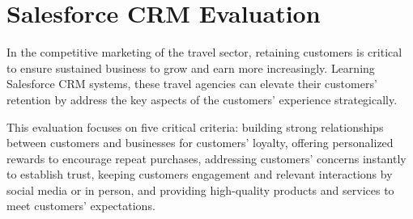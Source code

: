\section{Salesforce CRM Evaluation}

In the competitive marketing of the travel sector, retaining customers is critical to ensure sustained business to grow and earn more increasingly. Learning Salesforce CRM systems, these travel agencies can elevate their customers' retention by address the key aspects of the customers' experience strategically.

This evaluation focuses on five critical criteria: building strong relationships between customers and businesses for customers' loyalty, offering personalized rewards to encourage repeat purchases, addressing customers' concerns instantly to establish trust, keeping customers engagement and relevant interactions by social media or in person, and providing high-quality products and services to meet customers' expectations.